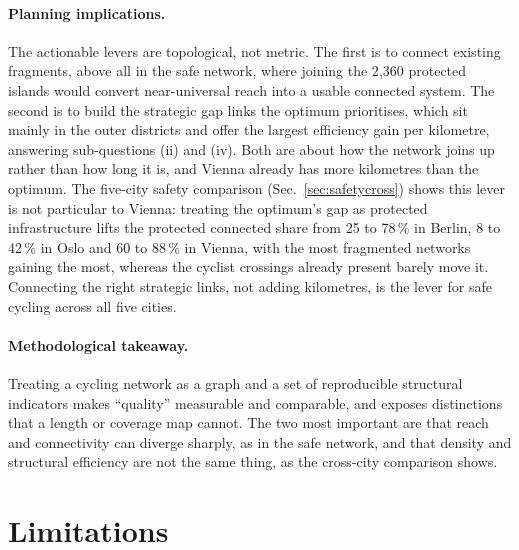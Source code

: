 \documentclass[11pt,a4paper]{article}
\begin{document}
\paragraph{Planning implications.} The actionable levers are topological, not metric. The
first is to connect existing fragments, above all in the safe network, where joining the
2{,}360 protected islands would convert near-universal reach into a usable connected system.
The second is to build the strategic gap links the optimum prioritises, which sit mainly in
the outer districts and offer the largest efficiency gain per kilometre, answering
sub-questions (ii) and (iv). Both are about how the network joins up rather than how long it
is, and Vienna already has more kilometres than the optimum. The five-city safety comparison
(Sec.~\ref{sec:safetycross}) shows this lever is not particular to Vienna: treating the
optimum's gap as protected infrastructure lifts the protected connected share from 25 to
78\,\% in Berlin, 8 to 42\,\% in Oslo and 60 to 88\,\% in Vienna, with the most fragmented
networks gaining the most, whereas the cyclist crossings already present barely move it.
Connecting the right strategic links, not adding kilometres, is the lever for safe cycling
across all five cities.

\paragraph{Methodological takeaway.} Treating a cycling network as a graph and a set of
reproducible structural indicators makes ``quality'' measurable and comparable, and exposes
distinctions that a length or coverage map cannot. The two most important are that reach and
connectivity can diverge sharply, as in the safe network, and that density and structural
efficiency are not the same thing, as the cross-city comparison shows.

\section{Limitations}
\label{sec:limits}
\end{document}
